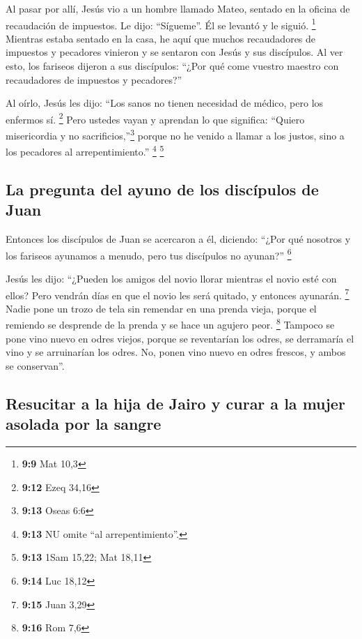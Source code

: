 \begin{paracol}{2}
 Al pasar por allí, Jesús vio a un hombre llamado Mateo,
sentado en la oficina de recaudación de impuestos. Le dijo: ``Sígueme''.
Él se levantó y le siguió. \footnote{\textbf{9:9} Mat 10,3}
 Mientras estaba sentado en la casa, he aquí que muchos
recaudadores de impuestos y pecadores vinieron y se sentaron con Jesús y
sus discípulos.  Al ver esto, los fariseos dijeron a sus
discípulos: ``¿Por qué come vuestro maestro con recaudadores de
impuestos y pecadores?''

 Al oírlo, Jesús les dijo: ``Los sanos no tienen
necesidad de médico, pero los enfermos sí. \footnote{\textbf{9:12} Ezeq
  34,16}  Pero ustedes vayan y aprendan lo que significa:
``Quiero misericordia y no sacrificios,''\footnote{\textbf{9:13} Oseas
  6:6} porque no he venido a llamar a los justos, sino a los pecadores
al arrepentimiento.'' \footnote{\textbf{9:13} NU omite ``al
  arrepentimiento''.} \footnote{\textbf{9:13} 1Sam 15,22; Mat 18,11}

\hypertarget{la-pregunta-del-ayuno-de-los-discuxedpulos-de-juan}{%
\subsection{La pregunta del ayuno de los discípulos de
Juan}\label{la-pregunta-del-ayuno-de-los-discuxedpulos-de-juan}}

 Entonces los discípulos de Juan se acercaron a él,
diciendo: ``¿Por qué nosotros y los fariseos ayunamos a menudo, pero tus
discípulos no ayunan?'' \footnote{\textbf{9:14} Luc 18,12}

 Jesús les dijo: ``¿Pueden los amigos del novio llorar
mientras el novio esté con ellos? Pero vendrán días en que el novio les
será quitado, y entonces ayunarán. \footnote{\textbf{9:15} Juan 3,29}
 Nadie pone un trozo de tela sin remendar en una prenda
vieja, porque el remiendo se desprende de la prenda y se hace un agujero
peor. \footnote{\textbf{9:16} Rom 7,6}  Tampoco se pone
vino nuevo en odres viejos, porque se reventarían los odres, se
derramaría el vino y se arruinarían los odres. No, ponen vino nuevo en
odres frescos, y ambos se conservan''.

\hypertarget{resucitar-a-la-hija-de-jairo-y-curar-a-la-mujer-asolada-por-la-sangre}{%
\subsection{Resucitar a la hija de Jairo y curar a la mujer asolada por
la
sangre}\label{resucitar-a-la-hija-de-jairo-y-curar-a-la-mujer-asolada-por-la-sangre}}


\end{paracol}
